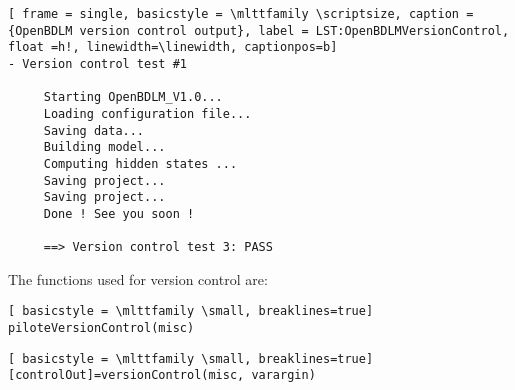  \begin{lstlisting}[ frame = single, basicstyle = \mlttfamily \scriptsize, caption = {OpenBDLM version control output}, label = LST:OpenBDLMVersionControl,  float =h!, linewidth=\linewidth, captionpos=b]
- Version control test #1
 
     Starting OpenBDLM_V1.0...
     Loading configuration file...
     Saving data...
     Building model...
     Computing hidden states ...
     Saving project...
     Saving project...
     Done ! See you soon !
 
     ==> Version control test 3: PASS
\end{lstlisting}

The functions used for version control are:
\begin{description}[style=unboxed]\setlength\itemsep{0em}

\item[Pilot function for version control] \leavevmode
  \begin{lstlisting}[ basicstyle = \mlttfamily \small, breaklines=true]
piloteVersionControl(misc)
  \end{lstlisting}

\item[Version control for OpenBDLM] \leavevmode
  \begin{lstlisting}[ basicstyle = \mlttfamily \small, breaklines=true]
[controlOut]=versionControl(misc, varargin)
  \end{lstlisting}

\end{description}